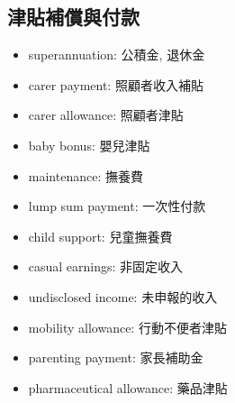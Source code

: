 \subsection*{津貼補償與付款}
\begin{multicols}{2}
\begin{itemize}
  \itemsep0em
  \item superannuation: 公積金, 退休金
  \item carer payment: 照顧者收入補貼
  \item carer allowance: 照顧者津貼
  \item baby bonus: 嬰兒津貼
  \item maintenance: 撫養費
  \item lump sum payment: 一次性付款
  \item child support: 兒童撫養費
  \item casual earnings: 非固定收入
  \item undisclosed income: 未申報的收入
  \item mobility allowance: 行動不便者津貼
  \item parenting payment: 家長補助金
  \item pharmaceutical allowance: 藥品津貼
\end{itemize}
\end{multicols}

